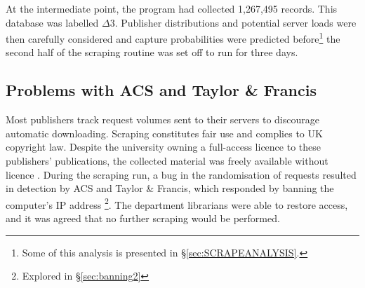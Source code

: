At the intermediate point, the program had collected 1,267,495 records. This database was labelled $\Delta3$. Publisher distributions and potential server loads were then carefully considered and capture probabilities were predicted before\footnote{Some of this analysis is presented in \S\ref{sec:SCRAPEANALYSIS}.} the second half of the scraping routine was set off to run for three days.
\label{sec:CROSSREFSCRAPE}
\subsection{Problems with ACS and Taylor \& Francis}
\label{sec:banning1}
Most publishers track request volumes sent to their servers to discourage automatic downloading. Scraping constitutes fair use and complies to UK copyright law. Despite the university owning a full-access licence to these publishers' publications, the collected material was freely available without licence\cite{thelaw} \cite{contentminelegal}. During the scraping run, a bug in the randomisation of requests resulted in detection by ACS and Taylor \& Francis, which responded by banning the computer's IP address \footnote{Explored in \S\ref{sec:banning2}}. The department librarians were able to restore access, and it was agreed that no further scraping would be performed.
